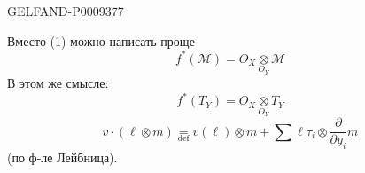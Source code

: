 \begin{GelfandAdjacentEvidence}{GELFAND-P000937}{7}


Вместо (1) можно написать проще
\begin{equation*}
 f^*(\mathcal M)=O_X\mathbin{\underset{O_Y}{\otimes}}\mathcal M
 \tag{4}
\end{equation*}
В этом же смысле:
\begin{equation*}
 f^*(T_Y)=O_X\mathbin{\underset{O_Y}{\otimes}}T_Y
 \tag{5}
\end{equation*}
\begin{equation*}
 v\cdot(\ell\otimes m)\underset{\mathrm{def}}{=}
 v(\ell)\otimes m+\sum\ell\tau_i\otimes\frac{\partial}{\partial y_i}m
 \tag{6}
\end{equation*}
(по ф-ле Лейбница).
\end{GelfandAdjacentEvidence}



